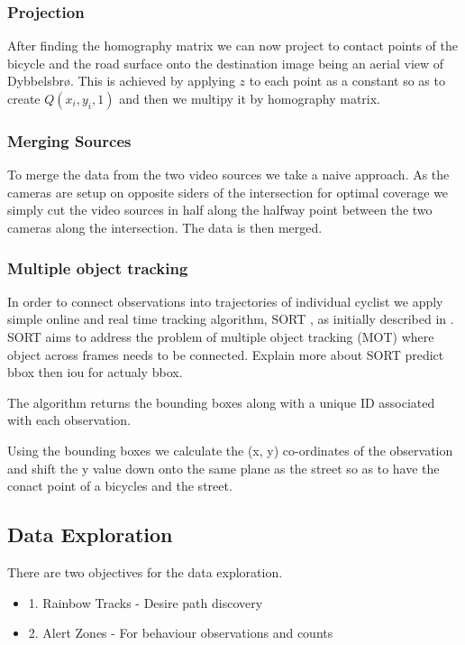\subsubsection{Projection}

After finding the homography matrix we can now project to contact points of the bicycle and the road surface onto the destination
image being an aerial view of Dybbelsbrø. This is achieved by applying $z$ to each point as a constant so as to create $Q(x_i, y_i, 1)$ and then we multipy it by 
homography matrix. 
\ \\
\subsubsection{Merging Sources}

To merge the data from the two video sources we take a naive approach. As the cameras are setup on
opposite siders of the intersection for optimal coverage we simply cut the video sources in half along the halfway point between
the two cameras along the intersection. The data is then merged.
\ \\
\subsubsection{Multiple object tracking}

In order to connect observations into trajectories of individual cyclist we apply 
simple online and real time tracking algorithm, SORT \cite{abewley_abewley/sort_2021}, as initially described in \cite{Bewley2016_sort}. 
SORT aims to address the problem of multiple object tracking (MOT) where object across frames needs to be connected. 
Explain more about SORT predict bbox then iou for actualy bbox.

The algorithm returns the bounding boxes along with a unique ID associated with each observation.

Using the bounding boxes we calculate the (x, y) co-ordinates of the observation and shift the y value down onto 
the same plane as the street so as to have the conact point of a bicycles and the street.

\subsection{Data Exploration}

There are two objectives for the data exploration.
\begin{itemize}
	\item1. Rainbow Tracks - Desire path discovery
	\item2. Alert Zones - For behaviour observations and counts
\end{itemize}


